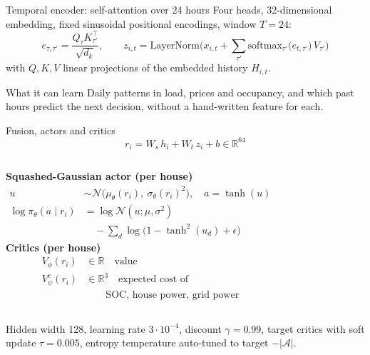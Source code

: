 \documentclass[aspectratio=169,10pt]{beamer}
\newcommand{\R}{\mathbb{R}}
\begin{document}
\begin{frame}{Temporal encoder: self-attention over 24 hours}
Four heads, 32-dimensional embedding, fixed sinusoidal positional encodings, window $T = 24$:
\[
e_{\tau,\tau'} = \frac{Q_\tau K_{\tau'}^\top}{\sqrt{d_k}},
\qquad
z_{i,t} = \mathrm{LayerNorm}\Big(x_{i,t} + \sum_{\tau'} \mathrm{softmax}_{\tau'}\big(e_{t,\tau'}\big)\, V_{\tau'}\Big)
\]
with $Q, K, V$ linear projections of the embedded history $H_{i,t}$.
\vspace{0.5em}
\begin{block}{What it can learn}
Daily patterns in load, prices and occupancy, and which past hours predict the next decision, without a hand-written feature for each.
\end{block}
\end{frame}

\begin{frame}{Fusion, actors and critics}
\[
r_i = W_s\, h_i + W_t\, z_i + b \in \R^{64}
\]
\small
\begin{columns}[T]
\textbf{Squashed-Gaussian actor (per house)}
\begin{align*}
u &\sim \mathcal N\big(\mu_\theta(r_i),\ \sigma_\theta(r_i)^2\big), \quad a = \tanh(u)\\
\log \pi_\theta(a\mid r_i) &= \log \mathcal N(u;\mu,\sigma^2)\\
 &\quad - \textstyle\sum_d \log\big(1 - \tanh^2(u_d) + \epsilon\big)
\end{align*}
\textbf{Critics (per house)}
\begin{align*}
V_\phi(r_i) &\in \R \quad\text{value}\\
V^c_\psi(r_i) &\in \R^3 \quad\text{expected cost of}\\
&\qquad\text{SOC, house power, grid power}
\end{align*}
\end{columns}
\vspace{0.4em}
\small Hidden width 128, learning rate $3\cdot 10^{-4}$, discount $\gamma = 0.99$, target critics with soft update $\tau = 0.005$, entropy temperature auto-tuned to target $-|\mathcal A|$.
\end{frame}
\end{document}
